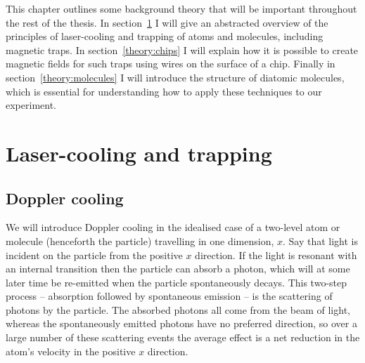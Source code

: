 This chapter outlines some background theory that will be important throughout
the rest of the thesis. In section~\ref{theory:cooltrap} I will give an
abstracted overview of the principles of laser-cooling and trapping of atoms
and molecules, including magnetic traps. In section~\ref{theory:chips} I will
explain how it is possible to create magnetic fields for such traps using wires
on the surface of a chip. Finally in section~\ref{theory:molecules} I will
introduce the structure of diatomic molecules, which is essential for
understanding how to apply these techniques to our experiment.

\section{Laser-cooling and trapping}
\label{theory:cooltrap}

\subsection{Doppler cooling}

We will introduce Doppler cooling in the idealised case of a two-level atom or
molecule (henceforth the particle) travelling in one dimension, $x$.  Say that
light is incident on the particle from the positive $x$ direction. If the light
is resonant with an internal transition then the particle can absorb a photon,
which will at some later time be re-emitted when the particle spontaneously
decays.
%
This two-step process -- absorption followed by spontaneous emission -- is the
scattering of photons by the particle. The absorbed photons all come from the
beam of light, whereas the spontaneously emitted photons have no preferred
direction, so over a large number of these scattering events the average effect
is a net reduction in the atom's velocity in the positive $x$ direction.

